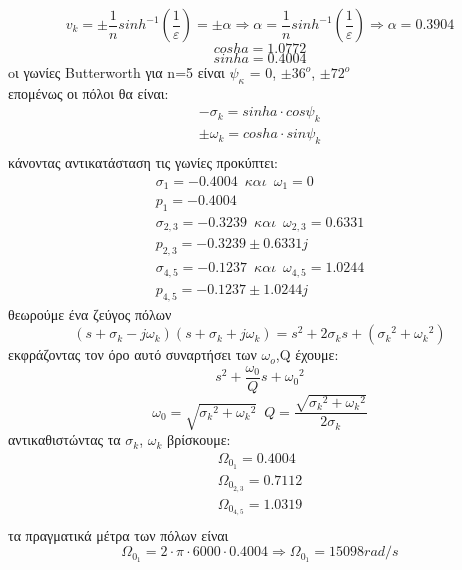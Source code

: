 \documentclass{article}
\begin{document}
\begin{equation*}
v_k = \pm \frac{1}{n}sinh^{-1}(\frac{1}{ε}) = \pm α \Rightarrow α = \frac{1}{n}sinh^{-1}(\frac{1}{ε}) \Rightarrow \boxed{α = 0.3904}
\end{equation*}
\begin{equation*}
\boxed{cosha =1.0772} 
\end{equation*}
\begin{equation*}
  \boxed{sinha = 0.4004}
\end{equation*}
oι γωνίες Butterworth για n=5 είναι $ψ_κ$ = 0, $\pm36^o$, $\pm72^o$ 
\\ επομένως οι πόλοι θα είναι:
\begin{align*}
-σ_k = sinha \cdot cosψ_k \\
\pm ω_k = cosha \cdot sin ψ_k \\
\end{align*}
κάνοντας αντικατάσταση τις γωνίες προκύπτει:
\begin{align*}
σ_1 = -0.4004 \enspace και \enspace ω_1 = 0 \\
\boxed{p_1 = -0.4004} \\
σ_{2,3} = - 0.3239 \enspace και \enspace ω_{2,3} = 0.6331 \\
\boxed{p_{2,3} = -0.3239 \pm 0.6331j} \\
σ_{4,5} = -0.1237 \enspace και \enspace ω_{4,5} = 1.0244\\
\boxed{p_{4,5} = -0.1237 \pm 1.0244j}
\end{align*}
θεωρούμε ένα ζεύγος πόλων
\begin{equation*}
(s+σ_k-jω_k)(s+σ_k+jω_k) = s^2 + 2σ_ks + ({σ_k}^2+{ω_k}^2)
\end{equation*}
εκφράζοντας τον όρο αυτό συναρτήσει των $ω_o$,Q έχουμε:
\begin{equation*}
s^2 + \frac{ω_0}{Q} s  + {ω_0}^2
\end{equation*}
\begin{equation*}
\boxed{{ω_0} = \sqrt{{σ_k}^2+{ω_k}^2}} \enspace 
\boxed{Q = \frac{\sqrt{{σ_k}^2 + {ω_k}^2}}{2σ_k}} 
\end{equation*}
αντικαθιστώντας τα $σ_k$, $ω_k$ βρίσκουμε:
\begin{align*}
Ω_{0_1} = 0.4004 \\
Ω_{0_{2,3}} = 0.7112 \\
Ω_{0_{4,5}} = 1.0319 \\
\end{align*}
τα πραγματικά μέτρα των πόλων είναι
\begin{equation*}
Ω_{0_1} = 2\cdot π \cdot 6000 \cdot 0.4004 \Rightarrow \boxed{Ω_{0_1} = 15098 rad/s}
\end{equation*}
\end{document}
